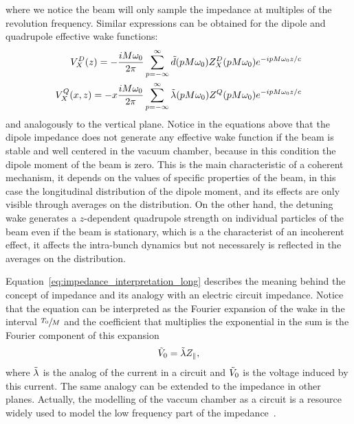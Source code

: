     where we notice the beam will only sample the impedance at multiples of the revolution frequency. Similar expressions can be obtained for the dipole and quadrupole effective wake functions:
    \begin{subequations}\label{eq:impedance_interpretation_trans}
    \begin{align}\label{eq:impedance_interpretation_dip}
  		V^D_X(z) = -\frac{iM\omega_0}{2\pi} \sum_{p=-\infty}^\infty \tilde{d}(pM\omega_0)Z^D_X(pM\omega_0)e^{-ipM\omega_0 z/c}\\
        \label{eq:impedance_interpretation_quad}
		V^Q_X(x,z) = -x\frac{iM\omega_0}{2\pi} \sum_{p=-\infty}^\infty \tilde{\lambda}(pM\omega_0)Z^Q(pM\omega_0)e^{-ipM\omega_0 z/c}
    \end{align}
    \end{subequations}
    and analogously to the vertical plane. Notice in the equations above that the dipole impedance does not generate any effective wake function if the beam is stable and well centered in the vacuum chamber, because in this condition the dipole moment of the beam is zero. This is the main characteristic of a coherent mechanism, it depends on the values of specific properties of the beam, in this case the longitudinal distribution of the dipole moment, and its effects are only visible through averages on the distribution. On the other hand, the detuning wake generates a $z$-dependent quadrupole strength on individual particles of the beam even if the beam is stationary, which is a the characterist of an incoherent effect, it affects the intra-bunch dynamics but not necessarely is reflected in the averages on the distribution.

    Equation~\eqref{eq:impedance_interpretation_long} describes the meaning behind the concept of impedance and its analogy with an electric circuit impedance. Notice that the equation can be interpreted as the Fourier expansion of the wake in the interval $\sfrac{T_0}{M}$ and the coefficient that multiplies the exponential in the sum is the Fourier component of this expansion
    \begin{align}
  	  	\tilde{V}_0 = \tilde{\lambda}Z_\parallel,
    \end{align}
    where $\tilde{\lambda}$ is the analog of the current in a circuit and $\tilde{V}_0$ is the voltage induced by this current. The same analogy can be extended to the impedance in other planes. Actually, the modelling of the vaccum chamber as a circuit is a resource widely used to model the low frequency part of the impedance~\cite{Sessler1967,Zotter1998,Davino2003}.

